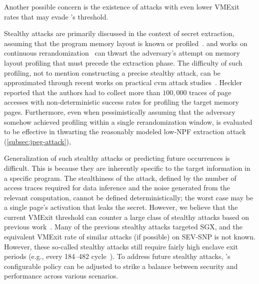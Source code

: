 Another possible concern is the existence of attacks with even lower VMExit rates that may evade \thename's threshold.

Stealthy attacks are primarily discussed in the context of secret extraction, assuming that the program memory layout is known or profiled~\cite{wang2017leaky,bulk2017telling}.
\thename and works on continuous rerandomization~\cite{brasser2019drsgx,zhang2020klotski,ahmad2019obfuscuro} can thwart the adversary's attempt on memory layout profiling that must precede the extraction phase.
The difficulty of such profiling, not to mention constructing a precise stealthy attack, can be approximated through recent works on practical \gls{cvm} attack studies~\cite{wesee,heckler}.
Heckler~\cite{heckler} reported that the authors had to collect more than $100,000$ traces of page accesses with non-deterministic success rates for profiling the target memory pages.
Furthermore, even when pessimistically assuming that the adversary somehow achieved profiling within a single rerandomization window, \thename is evaluated to be effective in thwarting the reasonably modeled low-NPF extraction attack (\cref{subsec:jpeg-attack}),

Generalization of such stealthy attacks or predicting future occurrences is difficult.
This is because they are inherently specific to the target information in a specific program.
The stealthiness of the attack, defined by the number of access traces required for data inference and the noise generated from the relevant computation, cannot be defined deterministically;
the worst case may be a single page's activation that leaks the secret.
However, we believe that the current VMExit threshold can counter a large class of stealthy attacks based on previous work~\cite{wang2017leaky,bulk2017telling}.
Many of the previous stealthy attacks targeted SGX, and the equivalent VMExit rate of similar attacks (if possible) on SEV-SNP is not known.
However, these so-called stealthy attacks still require fairly high enclave exit periods (e.g., every 184--482 cycle~\cite{wang2017leaky}).
To address future stealthy attacks, \thename's configurable policy can be adjusted to strike a balance between security and performance across various scenarios.




